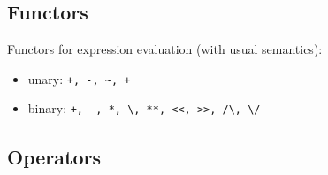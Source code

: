 \subsection{Functors}

Functors for expression evaluation (with usual semantics):
\begin{itemize}
    \item unary:  \verb|+, -, ~, +|
    \item binary:  \verb|+, -, *, \, **, <<, >>, /\, \/|
\end{itemize}

\subsection{Operators}

